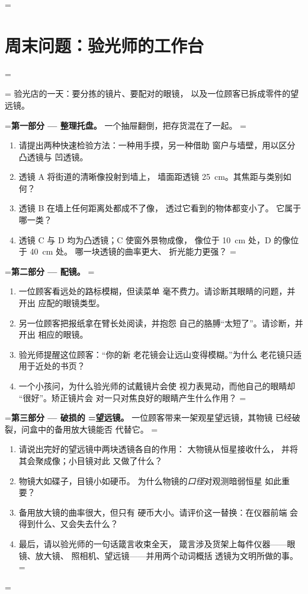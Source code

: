 =\section{周末问题：验光师的工作台}

=\begin{problem}
=\label{pb:g8:lenses-images:1}
验光店的一天：要分拣的镜片、要配对的眼镜，
以及一位顾客已拆成零件的望远镜。

=\medskip\noindent\textbf{第一部分 --- 整理托盘。}
一个抽屉翻倒，把存货混在了一起。
=\begin{enumerate}
  \item 请提出两种快速检验方法：一种用手摸，另一种借助
        窗户与墙壁，用以区分凸透镜与
        凹透镜。
  \item 透镜 A 将街道的清晰像投射到墙上，
        墙面距透镜 \qty{25}{cm}。其焦距与类别如何？
  \item 透镜 B 在墙上任何距离处都成不了像，
        透过它看到的物体都变小了。
        它属于哪一类？
  \item 透镜 C 与 D 均为凸透镜；C 使窗外景物成像，
        像位于 \qty{10}{cm} 处，D 的像位于 \qty{40}{cm} 处。
        哪一块透镜的曲率更大、
        折光能力更强？
=\end{enumerate}

=\medskip\noindent\textbf{第二部分 --- 配镜。}
=\begin{enumerate}[resume]
  \item 一位顾客看远处的路标模糊，但读菜单
        毫不费力。请诊断其眼睛的问题，并开出
        应配的眼镜类型。
  \item 另一位顾客把报纸拿在臂长处阅读，并抱怨
        自己的胳膊“太短了”。请诊断，并开出
        相应的眼镜。
  \item 验光师提醒这位顾客：“你的新
        老花镜会让远山变得模糊。”为什么
        老花镜只适用于近处的书页？
  \item 一个小孩问，为什么验光师的试戴镜片会使
        视力表晃动，而他自己的眼睛却
        “很好”。矫正镜片会
        对一只对焦良好的眼睛产生什么作用？
=\end{enumerate}

=\medskip\noindent\textbf{第三部分 --- 破损的
=望远镜。}
一位顾客带来一架观星望远镜，其物镜
已经破裂，问盒中的备用放大镜能否
代替它。
=\begin{enumerate}[resume]
  \item 请说出完好的望远镜中两块透镜各自的作用：
        大物镜从恒星接收什么，
        并将其会聚成像；小目镜对此
        又做了什么？
  \item 物镜大如碟子，目镜小如硬币。
        为什么物镜的\emph{口径}对观测暗弱恒星
        如此重要？
  \item 备用放大镜的曲率很大，但只有
        硬币大小。请评价这一替换：在仪器前端
        会得到什么、又会失去什么？
  \item 最后，请以验光师的一句话箴言收束全天，
        箴言涉及货架上每件仪器——眼镜、放大镜、
        照相机、望远镜——并用两个动词概括
        透镜为文明所做的事。
=\end{enumerate}
=\end{problem}
